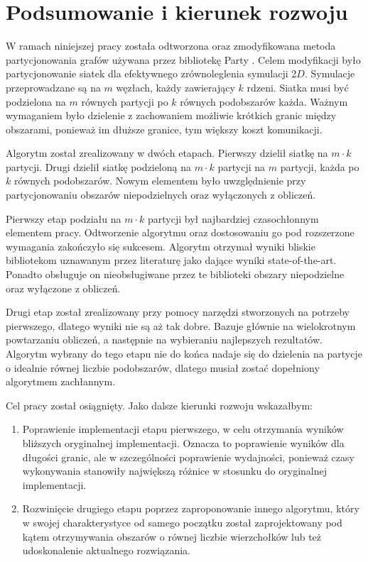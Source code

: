 \newpage
\section{Podsumowanie i kierunek rozwoju}

W ramach niniejszej pracy została odtworzona oraz zmodyfikowana metoda partycjonowania grafów używana przez
bibliotekę Party \cite{1364754}.
Celem modyfikacji było partycjonowanie siatek dla efektywnego zrównoleglenia symulacji 2$D$.
Symulacje przeprowadzane są na $m$ węzłach, każdy zawierający $k$ rdzeni.
Siatka musi być podzielona na $m$ równych partycji po $k$ równych podobszarów każda.
Ważnym wymaganiem było dzielenie z zachowaniem możliwie krótkich granic między obszarami, ponieważ im dłuższe granice,
tym większy koszt komunikacji.

Algorytm został zrealizowany w dwóch etapach.
Pierwszy dzielił siatkę na $m \cdot k$ partycji.
Drugi dzielił siatkę podzieloną na $m \cdot k$ partycji na $m$ partycji, każda po $k$ równych podobszarów.
Nowym elementem było uwzględnienie przy partycjonowaniu obszarów niepodzielnych oraz wyłączonych
z obliczeń.

Pierwszy etap podziału na $m \cdot k$ partycji był najbardziej czasochłonnym elementem pracy.
Odtworzenie algorytmu oraz dostosowaniu go pod rozszerzone wymagania zakończyło się sukcesem.
Algorytm otrzymał wyniki bliskie bibliotekom uznawanym przez literaturę jako dające wyniki state-of-the-art.
Ponadto obsługuje on nieobsługiwane przez te biblioteki obszary niepodzielne oraz wyłączone z obliczeń.

Drugi etap został zrealizowany przy pomocy narzędzi stworzonych na potrzeby pierwszego, dlatego wyniki nie są
aż tak dobre.
Bazuje głównie na wielokrotnym powtarzaniu obliczeń, a następnie na wybieraniu najlepszych rezultatów.
Algorytm wybrany do tego etapu nie do końca nadaje się do dzielenia na partycje o idealnie równej liczbie podobszarów,
dlatego musiał zostać dopełniony algorytmem zachłannym.

Cel pracy został osiągnięty.
Jako dalsze kierunki rozwoju wskazałbym:
\begin{enumerate}
    \item {Poprawienie implementacji etapu pierwszego, w celu otrzymania wyników bliższych oryginalnej implementacji.
    Oznacza to poprawienie wyników dla długości granic, ale w szczególności poprawienie wydajności,
    ponieważ czasy wykonywania stanowiły największą różnice w stosunku do oryginalnej implementacji.}
    \item {Rozwinięcie drugiego etapu poprzez zaproponowanie innego algorytmu, który w swojej charakterystyce
    od samego początku został zaprojektowany pod kątem otrzymywania obszarów o równej liczbie wierzchołków lub też
    udoskonalenie aktualnego rozwiązania.}
\end{enumerate}